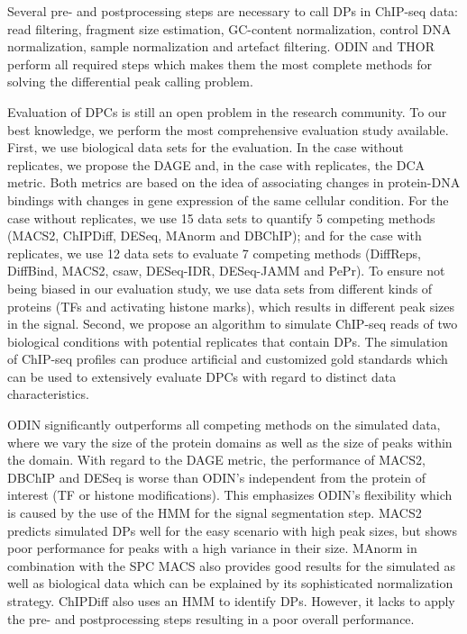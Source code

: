 Several pre- and postprocessing steps are necessary to call DPs in ChIP-seq data: read filtering, fragment size estimation, GC-content normalization, control DNA normalization, sample normalization and artefact filtering.
ODIN and THOR perform all required steps which makes them the most complete methods for solving the differential peak calling problem.

Evaluation of DPCs is still an open problem in the research community.
To our best knowledge, we perform the most comprehensive evaluation study available.
First, we use biological data sets for the evaluation.
In the case without replicates, we propose the DAGE and, in the case with replicates, the DCA metric.
Both metrics are based on the idea of associating changes in protein-DNA bindings with changes in gene expression of the same cellular condition.
For the case without replicates, we use 15 data sets to quantify 5 competing methods (MACS2, ChIPDiff, DESeq, MAnorm and DBChIP); and for the case with replicates, we use 12 data sets to evaluate 7 competing methods (DiffReps, DiffBind, MACS2, csaw, DESeq-IDR, DESeq-JAMM and PePr).
To ensure not being biased in our evaluation study, we use data sets from different kinds of proteins (TFs and activating histone marks), which results in different peak sizes in the signal.
Second, we propose an algorithm to simulate ChIP-seq reads of two biological conditions with potential replicates that contain DPs.
The simulation of ChIP-seq profiles can produce artificial and customized gold standards which can be used to extensively evaluate DPCs with regard to distinct data characteristics.

ODIN significantly outperforms all competing methods on the simulated data, where we vary the size of the protein domains as well as the size of peaks within the domain.
With regard to the DAGE metric, the performance of MACS2, DBChIP and DESeq is worse than ODIN's independent from the protein of interest (TF or histone modifications).
This emphasizes ODIN's flexibility which is caused by the use of the HMM for the signal segmentation step.
MACS2 predicts simulated DPs well for the easy scenario with high peak sizes, but shows poor performance for peaks with a high variance in their size.
MAnorm in combination with the SPC MACS also provides good results for the simulated as well as biological data which can be explained by its sophisticated normalization strategy.
ChIPDiff also uses an HMM to identify DPs.
However, it lacks to apply the pre- and postprocessing steps resulting in a poor overall performance.

